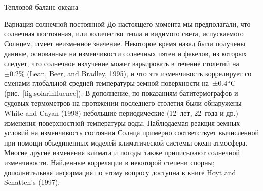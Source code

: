 \begin{chapter}{Тепловой баланс океана}
\begin{section}{Вариация солнечной постоянной}
До настоящего момента мы предполагали, что солнечная постоянная, или
количество тепла и видимого света, испускаемого Солнцем, имеет неизменное
значение. Некоторое время назад были получены данные, основанные на 
изменчивости солнечных пятен и факелов, из которых следует, что солнечное
излучение может варьировать в течение столетий на~$\pm 0.2\%$ (Lean, Beer, and Bradley, 1995), 
и что эта изменчивость коррелирует со сменами глобальной средней температуры
земной поверхности на~$\pm {0.4}^\circ\mbox{C}$ (рис.~\ref{fig:solarinfluence}). 
В дополнение, по показаниям батитермографов и судовых термометров на протяжении 
последнего столетия были обнаружены White and Cayan (1998) небольшие периодические 
(12~лет, 22~года и др.) изменения поверхностной температуры воды. Наблюдаемая
реакция земных условий на изменчивость состояния Солнца примерно соответствует
вычисленной при помощи объединенных моделей климатической системы 
океан-атмосфера. Многие другие изменения климата и погоды также приписывают
солнечной изменчивости. Найденные корреляции в некоторой степени спорны;
дополнительная информация по этому вопросу доступна в 
книге Hoyt and Schatten's (1997).
%
\end{section}


\end{chapter}
